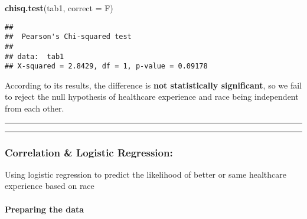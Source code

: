 \documentclass[]{article}
\newenvironment{Shaded}{\begin{snugshade}}{\end{snugshade}}
\newcommand{\DataTypeTok}[1]{\textcolor[rgb]{0.13,0.29,0.53}{#1}}
\newcommand{\DecValTok}[1]{\textcolor[rgb]{0.00,0.00,0.81}{#1}}
\newcommand{\KeywordTok}[1]{\textcolor[rgb]{0.13,0.29,0.53}{\textbf{#1}}}
\newcommand{\NormalTok}[1]{#1}
\newcommand{\OperatorTok}[1]{\textcolor[rgb]{0.81,0.36,0.00}{\textbf{#1}}}
\newcommand{\StringTok}[1]{\textcolor[rgb]{0.31,0.60,0.02}{#1}}
\let\oldparagraph\paragraph
\renewcommand{\paragraph}[1]{\oldparagraph{#1}\mbox{}}
\begin{document}
\begin{Shaded}
\begin{Highlighting}[]
\KeywordTok{chisq.test}\NormalTok{(tab1, }\DataTypeTok{correct =}\NormalTok{ F)}
\end{Highlighting}
\end{Shaded}

\begin{verbatim}
## 
##  Pearson's Chi-squared test
## 
## data:  tab1
## X-squared = 2.8429, df = 1, p-value = 0.09178
\end{verbatim}

According to its results, the difference is \textbf{not statistically
significant}, so we fail to reject the null hypothesis of healthcare
experience and race being independent from each other.

\begin{center}\rule{0.5\linewidth}{\linethickness}\end{center}

\begin{center}\rule{0.5\linewidth}{\linethickness}\end{center}

\hypertarget{correlation-logistic-regression}{%
\subsubsection{Correlation \& Logistic
Regression:}\label{correlation-logistic-regression}}

Using logistic regression to predict the likelihood of better or same
healthcare experience based on race

\hypertarget{preparing-the-data}{%
\paragraph{Preparing the data}\label{preparing-the-data}}

\begin{Shaded}
\end{Shaded}
\end{document}

